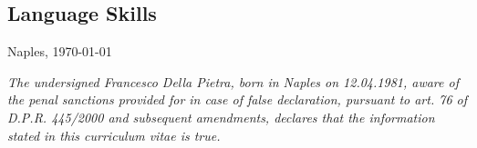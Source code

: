\documentclass[11pt,a4paper,sans,colorlinks,linkcolor=green]{moderncv}
\begin{document}
\subsection{Language Skills}

\vfill
\begin{flushright}
Naples, \today
\end{flushright}

\emptysection{}\closesection
\vfill
\begin{center}
\textit{\scriptsize The undersigned Francesco Della Pietra, born in Naples on 12.04.1981, aware of the penal sanctions provided for in case of false declaration, pursuant to art. 76 of D.P.R. 445/2000 and subsequent amendments, declares that the information stated in this curriculum vitae is true.}
\end{center}
\end{document}
